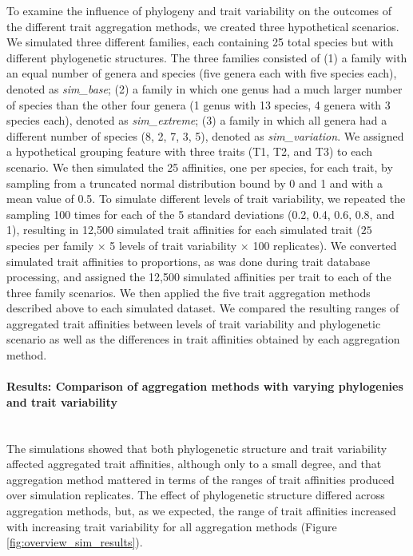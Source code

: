 \documentclass[12pt]{article}
\begin{document}
To examine the influence of phylogeny and trait variability on the outcomes of the different trait aggregation methods, we created three hypothetical scenarios. We simulated three different families, each containing 25 total species but with different phylogenetic structures. The three families consisted of (1) a family with an equal number of genera and species (five genera each with five species each), denoted as \textit{sim\_base}; (2) a family in which one genus had a much larger number of species than the other four genera (1 genus with 13 species, 4 genera with 3 species each), denoted as \textit{sim\_extreme}; (3) a family in which all genera had a different number of species (8, 2, 7, 3, 5), denoted as \textit{sim\_variation}. We assigned a hypothetical grouping feature with three traits (T1, T2, and T3) to each scenario. We then simulated the 25 affinities, one per species, for each trait, by sampling from a truncated normal distribution bound by 0 and 1 and with a mean value of 0.5. To simulate different levels of trait variability, we repeated the sampling 100 times for each of the 5 standard deviations (0.2, 0.4, 0.6, 0.8, and 1), resulting in 12,500 simulated trait affinities for each simulated trait ($25$ species per family $\times$ 5 levels of trait variability $\times$ 100 replicates). We converted simulated trait affinities to proportions, as was done during trait database processing, and assigned the 12,500 simulated affinities per trait to each of the three family scenarios. We then applied the five trait aggregation methods described above to each simulated dataset. We compared the resulting ranges of aggregated trait affinities between levels of trait variability and phylogenetic scenario as well as the differences in trait affinities obtained by each aggregation method.


\paragraph*{Results: Comparison of aggregation methods with varying phylogenies and trait variability}
\hfill
\\

The simulations showed that both phylogenetic structure and trait variability affected aggregated trait affinities, although only to a small degree, and that aggregation method mattered in terms of the ranges of trait affinities produced over simulation replicates. The effect of phylogenetic structure differed across aggregation methods, but, as we expected, the range of trait affinities increased with increasing trait variability for all aggregation methods (Figure \ref{fig:overview_sim_results}). 
\end{document}
